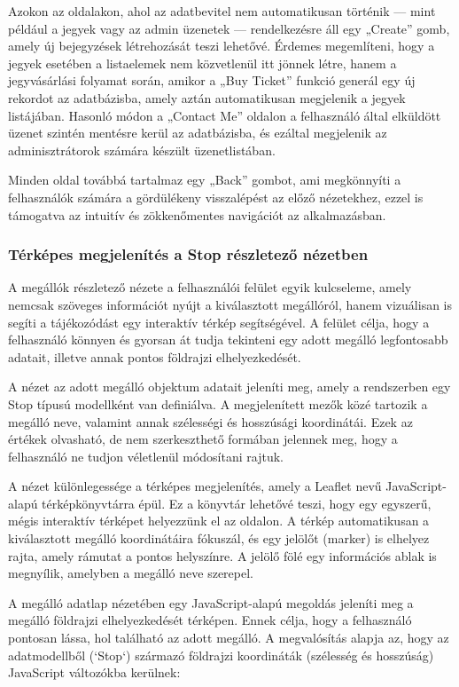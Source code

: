 Azokon az oldalakon, ahol az adatbevitel nem automatikusan történik — mint például a jegyek vagy az admin üzenetek — rendelkezésre áll egy „Create” gomb, amely új bejegyzések létrehozását teszi lehetővé. Érdemes megemlíteni, hogy a jegyek esetében a listaelemek nem közvetlenül itt jönnek létre, hanem a jegyvásárlási folyamat során, amikor a „Buy Ticket” funkció generál egy új rekordot az adatbázisba, amely aztán automatikusan megjelenik a jegyek listájában. Hasonló módon a „Contact Me” oldalon a felhasználó által elküldött üzenet szintén mentésre kerül az adatbázisba, és ezáltal megjelenik az adminisztrátorok számára készült üzenetlistában.

Minden oldal továbbá tartalmaz egy „Back” gombot, ami megkönnyíti a felhasználók számára a gördülékeny visszalépést az előző nézetekhez, ezzel is támogatva az intuitív és zökkenőmentes navigációt az alkalmazásban.

\subsubsection{Térképes megjelenítés a Stop részletező nézetben}
A megállók részletező nézete a felhasználói felület egyik kulcseleme, amely nemcsak szöveges információt nyújt a kiválasztott megállóról, hanem vizuálisan is segíti a tájékozódást egy interaktív térkép segítségével. A felület célja, hogy a felhasználó könnyen és gyorsan át tudja tekinteni egy adott megálló legfontosabb adatait, illetve annak pontos földrajzi elhelyezkedését.

A nézet az adott megálló objektum adatait jeleníti meg, amely a rendszerben egy Stop típusú modellként van definiálva. A megjelenített mezők közé tartozik a megálló neve, valamint annak szélességi és hosszúsági koordinátái. Ezek az értékek olvasható, de nem szerkeszthető formában jelennek meg, hogy a felhasználó ne tudjon véletlenül módosítani rajtuk.

A nézet különlegessége a térképes megjelenítés, amely a Leaflet nevű JavaScript-alapú térképkönyvtárra épül. Ez a könyvtár lehetővé teszi, hogy egy egyszerű, mégis interaktív térképet helyezzünk el az oldalon. A térkép automatikusan a kiválasztott megálló koordinátáira fókuszál, és egy jelölőt (marker) is elhelyez rajta, amely rámutat a pontos helyszínre. A jelölő fölé egy információs ablak is megnyílik, amelyben a megálló neve szerepel.

A megálló adatlap nézetében egy JavaScript-alapú megoldás jeleníti meg a megálló földrajzi elhelyezkedését térképen. Ennek célja, hogy a felhasználó pontosan lássa, hol található az adott megálló. A megvalósítás alapja az, hogy az adatmodellből (`Stop`) származó földrajzi koordináták (szélesség és hosszúság) JavaScript változókba kerülnek:

